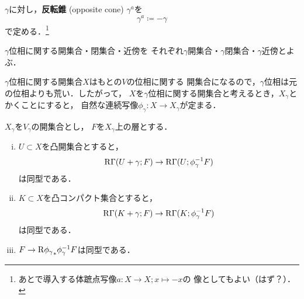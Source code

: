 \(\gamma\)に対し，\textbf{反転錐} (opposite cone) \(\gamma^a\)を
\[
    \gamma^a\coloneqq -\gamma
\]
で定める．\footnote{
    あとで導入する体蹠点写像\(a\colon X\to X;x\mapsto -x\)の
    像としてもよい（はず？）．
}

\(\gamma\)位相に関する開集合・閉集合・近傍を
それぞれ\(\gamma\)開集合・\(\gamma\)閉集合・\(\gamma\)近傍とよぶ．

\(\gamma\)位相に関する開集合\(X\)はもとの\(V\)の位相に関する
開集合になるので，\(\gamma\)位相は元の位相よりも荒い．したがって，
\(X\)を\(\gamma\)位相に関する開集合と考えるとき，\(X_\gamma\)と
かくことにすると，
自然な連続写像\(\phi_\gamma\colon X\to X_\gamma\)が定まる．

\begin{leftbar}
    \begin{PRP}
        \(X_\gamma\)を\(V_\gamma\)の開集合とし，
        \(F\)を\(X_\gamma\)上の層とする．
        \begin{enumerate}[(i)]
            \item \(U\subset X\)を凸開集合とすると，\[
                \mathop{\mathrm{R}\hspace{-0pt}\Gamma}\nolimits(U+\gamma;F)\to\mathop{\mathrm{R}\hspace{-0pt}\Gamma}\nolimits(U;\phi^{-1}_\gamma F)
            \]は同型である．
            \item \(K\subset X\)を凸コンパクト集合とすると，\[
                \mathop{\mathrm{R}\hspace{-0pt}\Gamma}\nolimits(K+\gamma;F)\to\mathop{\mathrm{R}\hspace{-0pt}\Gamma}\nolimits(K;\phi^{-1}_\gamma F)
            \]は同型である．
            \item \(F\to \mathrm{R}{\phi_{\gamma}}_\ast\phi_{\gamma}^{-1}F\)は同型である．
        \end{enumerate}
    \end{PRP}
\end{leftbar}





















